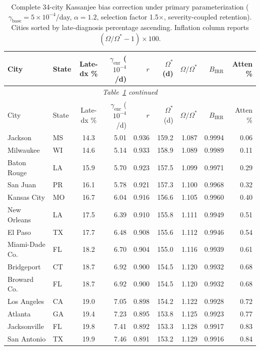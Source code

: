 \documentclass[11pt]{article}
\begin{document}
\begin{longtable}{@{}llcrrrrrr@{}}
\caption[34-city Kassanjee bias correction table]{Complete 34-city Kassanjee bias correction under primary parameterization ($\gamma_{\mathrm{base}} = 5\times10^{-4}$/day, $\alpha = 1.2$, selection factor 1.5$\times$, severity-coupled retention). Cities sorted by late-diagnosis percentage ascending. Inflation column reports $(\Omega/\Omega^* - 1) \times 100$.} \label{tab:full_34} \\

\toprule
City & State & Late-dx \% & $\gamma_{\mathrm{enr}}$ ($10^{-4}$/d) & $r$ & $\Omega^*$ (d) & $\Omega/\Omega^*$ & $B_{\mathrm{IRR}}$ & Atten \% \\
\midrule
\endfirsthead
\multicolumn{9}{c}{\textit{Table~\ref{tab:full_34} continued}} \\
\toprule
City & State & Late-dx \% & $\gamma_{\mathrm{enr}}$ ($10^{-4}$/d) & $r$ & $\Omega^*$ (d) & $\Omega/\Omega^*$ & $B_{\mathrm{IRR}}$ & Atten \% \\
\midrule
\endhead
\bottomrule
\endfoot
Jackson & MS & 14.3 & 5.01 & 0.936 & 159.2 & 1.087 & 0.9994 & 0.06 \\
Milwaukee & WI & 14.6 & 5.14 & 0.933 & 158.9 & 1.089 & 0.9989 & 0.11 \\
Baton Rouge & LA & 15.9 & 5.70 & 0.923 & 157.5 & 1.099 & 0.9971 & 0.29 \\
San Juan & PR & 16.1 & 5.78 & 0.921 & 157.3 & 1.100 & 0.9968 & 0.32 \\
Kansas City & MO & 16.7 & 6.04 & 0.916 & 156.6 & 1.105 & 0.9960 & 0.40 \\
New Orleans & LA & 17.5 & 6.39 & 0.910 & 155.8 & 1.111 & 0.9949 & 0.51 \\
El Paso & TX & 17.7 & 6.48 & 0.908 & 155.6 & 1.112 & 0.9946 & 0.54 \\
Miami-Dade Co. & FL & 18.2 & 6.70 & 0.904 & 155.0 & 1.116 & 0.9939 & 0.61 \\
Bridgeport & CT & 18.7 & 6.92 & 0.900 & 154.5 & 1.120 & 0.9932 & 0.68 \\
Broward Co. & FL & 18.7 & 6.92 & 0.900 & 154.5 & 1.120 & 0.9932 & 0.68 \\
Los Angeles & CA & 19.0 & 7.05 & 0.898 & 154.2 & 1.122 & 0.9928 & 0.72 \\
Atlanta & GA & 19.4 & 7.23 & 0.895 & 153.8 & 1.125 & 0.9923 & 0.77 \\
Jacksonville & FL & 19.8 & 7.41 & 0.892 & 153.3 & 1.128 & 0.9917 & 0.83 \\
San Antonio & TX & 19.9 & 7.46 & 0.891 & 153.2 & 1.129 & 0.9916 & 0.84 \\

\end{longtable}
\end{document}
